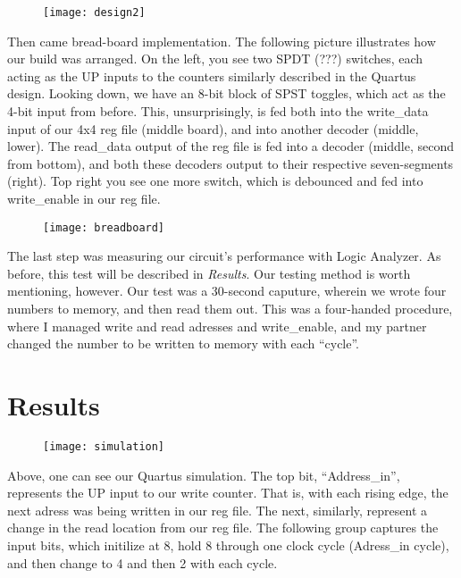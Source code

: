 \documentclass[titlepage]{article}
\begin{document}
        \begin{figure}[h]
        	\centering
        	\texttt{[image: design2]}
        \end{figure}
        
        Then came bread-board implementation.  The following picture illustrates how our build was arranged.
        On the left, you see two SPDT (???) switches, each acting as the UP inputs to the counters similarly described in the Quartus design.
        Looking down, we have an 8-bit block of SPST toggles, which act as the 4-bit input from before.
        This, unsurprisingly, is fed both into the write_data input of our 4x4 reg file (middle board), and into another decoder (middle, lower).
        The read_data output of the reg file is fed into a decoder (middle, second from bottom), and both these decoders output to their respective seven-segments (right).
        Top right you see one more switch, which is debounced and fed into write_enable in our reg file.
        
        \begin{figure}[h]
        	\centering
        	\texttt{[image: breadboard]}
        \end{figure}
        
        The last step was measuring our circuit's performance with Logic Analyzer.  As before, this test will be described in \textit{Results}.  
        Our testing method is worth mentioning, however.
        Our test was a 30-second caputure, wherein we wrote four numbers to memory, and then read them out.  
        This was a four-handed procedure, where I managed write and read adresses and write_enable, and my partner changed the number to be written to memory with each ``cycle''.
        
        
    \section{Results}
    
        \begin{figure}[h]
        	\centering
        	\texttt{[image: simulation]}
        \end{figure}
    
        Above, one can see our Quartus simulation.  The top bit, ``Address_in'', represents the UP input to our write counter.
        That is, with each rising edge, the next adress was being written in our reg file.
        The next, similarly, represent a change in the read location from our reg file.
        The following group captures the input bits, which initilize at 8, hold 8 through one clock cycle (Adress_in cycle), and then change to 4 and then 2 with each cycle.
        
\end{document}

